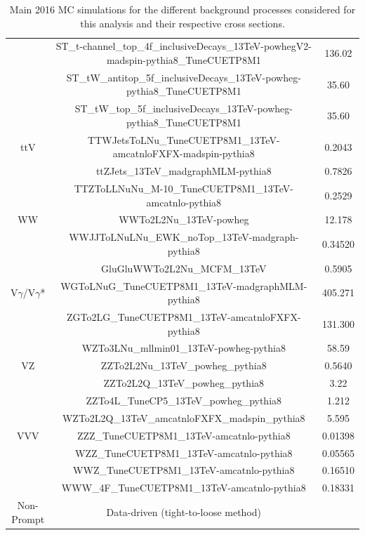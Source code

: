 \documentclass[a4paper, 10pt, openright]{report}
\begin{document}
\begin{appendices}
\begin{table}
\begin{center}
{\begin{tabular}{ c|c|c }
& ST\_t-channel\_top\_4f\_inclusiveDecays\_13TeV-powhegV2-madspin-pythia8\_TuneCUETP8M1 & 136.02 \\
& ST\_tW\_antitop\_5f\_inclusiveDecays\_13TeV-powheg-pythia8\_TuneCUETP8M1 & 35.60 \\
& ST\_tW\_top\_5f\_inclusiveDecays\_13TeV-powheg-pythia8\_TuneCUETP8M1 & 35.60 \\
\hline
\multirow{1}{*}{ttV} & TTWJetsToLNu\_TuneCUETP8M1\_13TeV-amcatnloFXFX-madspin-pythia8 & 0.2043 \\
& ttZJets\_13TeV\_madgraphMLM-pythia8 & 0.7826 \\
& TTZToLLNuNu\_M-10\_TuneCUETP8M1\_13TeV-amcatnlo-pythia8 & 0.2529 \\
\hline
WW & WWTo2L2Nu\_13TeV-powheg & 12.178 \\
& WWJJToLNuLNu\_EWK\_noTop\_13TeV-madgraph-pythia8 & 0.34520 \\
& GluGluWWTo2L2Nu\_MCFM\_13TeV & 0.5905 \\
\hline
V$\gamma$/V$\gamma$* & WGToLNuG\_TuneCUETP8M1\_13TeV-madgraphMLM-pythia8 & 405.271 \\ 
& ZGTo2LG\_TuneCUETP8M1\_13TeV-amcatnloFXFX-pythia8 & 131.300 \\
& WZTo3LNu\_mllmin01\_13TeV-powheg-pythia8 & 58.59 \\
\hline
VZ & ZZTo2L2Nu\_13TeV\_powheg\_pythia8 & 0.5640 \\
& ZZTo2L2Q\_13TeV\_powheg\_pythia8 & 3.22 \\
& ZZTo4L\_TuneCP5\_13TeV\_powheg\_pythia8 & 1.212 \\
& WZTo2L2Q\_13TeV\_amcatnloFXFX\_madspin\_pythia8 & 5.595 \\
 \hline
 VVV & ZZZ\_TuneCUETP8M1\_13TeV-amcatnlo-pythia8 & 0.01398 \\
 & WZZ\_TuneCUETP8M1\_13TeV-amcatnlo-pythia8 & 0.05565 \\
 & WWZ\_TuneCUETP8M1\_13TeV-amcatnlo-pythia8 & 0.16510 \\
 & WWW\_4F\_TuneCUETP8M1\_13TeV-amcatnlo-pythia8 & 0.18331 \\
 \hline
 Non-Prompt & Data-driven (tight-to-loose method) & \\
 \hline
\end{tabular}
}
\caption{Main 2016 \ac{MC} simulations for the different background processes considered for this analysis and their respective cross sections.}
\label{table:MC2016}
\end{center}
\end{table}


\end{appendices}
\end{document}
